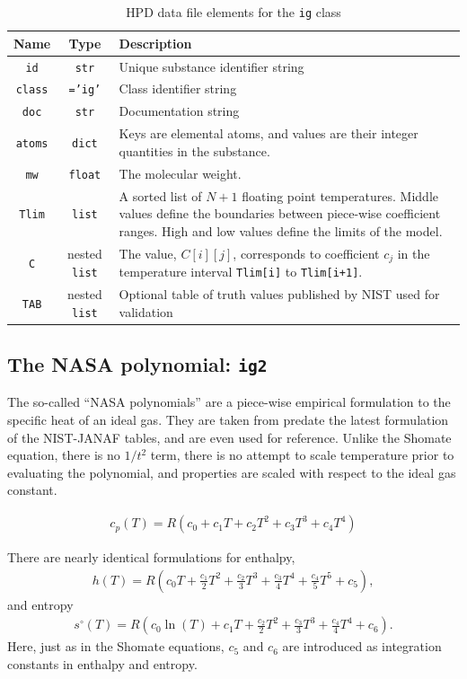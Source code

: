 \begin{table}
\centering
\caption{HPD data file elements for the \texttt{ig} class}\label{tab:class:ig}
\begin{tabular}{|ccp{2.5in}|}
\hline
Name & Type & Description\\
\hline
\texttt{id} & \texttt{str} & Unique substance identifier string\\
\texttt{class} & \texttt{='ig'} & Class identifier string\\
\texttt{doc} & \texttt{str} & Documentation string\\
\hline
\texttt{atoms} & \texttt{dict} & Keys are elemental atoms, and values are their integer quantities in the substance.\\
\texttt{mw} & \texttt{float} & The molecular weight.\\
\texttt{Tlim} & \texttt{list} & A sorted list of $N+1$ floating point temperatures.  Middle values define the boundaries between piece-wise coefficient ranges.  High and low values define the limits of the model.\\
\texttt{C} & nested \texttt{list} & The value, $C[i][j]$, corresponds to coefficient $c_j$ in the temperature interval \texttt{Tlim[i]} to \texttt{Tlim[i+1]}.\\
\hline
\texttt{TAB} & nested \texttt{list} & Optional table of truth values published by NIST used for validation\\
\hline
\end{tabular}
\end{table}


\subsection{The NASA polynomial: \texttt{ig2}}\label{sec:ig:ig2}

The so-called ``NASA polynomials'' are a piece-wise empirical formulation to the specific heat of an ideal gas.  They are taken from \cite{mcbride:1993} predate the latest formulation of the NIST-JANAF tables, and are even used for reference.  Unlike the Shomate equation, there is no $1/t^2$ term, there is no attempt to scale temperature prior to evaluating the polynomial, and properties are scaled with respect to the ideal gas constant.

\begin{align}
c_p(T) = R\left(c_0 + c_1 T + c_2 T^2 + c_3 T^3 + c_4 T^4\right)
\end{align}

There are nearly identical formulations for enthalpy,
\begin{align}
h(T) = R \left(c_0 T + \frac{c_1}{2} T^2 + \frac{c_2}{3} T^3 + \frac{c_3}{4} T^4 + \frac{c_4}{5}T^5 + c_5 \right),
\end{align}
and entropy
\begin{align}
s^\circ(T) = R \left(c_0 \ln(T) + c_1 T + \frac{c_2}{2} T^2 + \frac{c_3}{3} T^3 + \frac{c_4}{4} T^4 + c_6\right).
\end{align}
Here, just as in the Shomate equations, $c_5$ and $c_6$ are introduced as integration constants in enthalpy and entropy.

